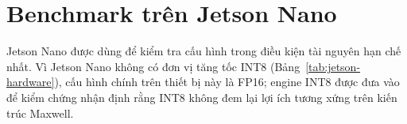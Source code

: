 \section{Benchmark trên Jetson Nano}

Jetson Nano được dùng để kiểm tra cấu hình trong điều kiện tài nguyên hạn chế
nhất. Vì Jetson Nano không có đơn vị tăng tốc INT8 (Bảng~\ref{tab:jetson-hardware}),
cấu hình chính trên thiết bị này là FP16; engine INT8 được đưa vào để kiểm chứng
nhận định rằng INT8 không đem lại lợi ích tương xứng trên kiến trúc Maxwell.

\begin{table}[H]
\centering
\caption{Suy luận YOLO26n trên Jetson Nano (ảnh 640, batch 1)}
\label{tab:nano-inference}
\end{table}
